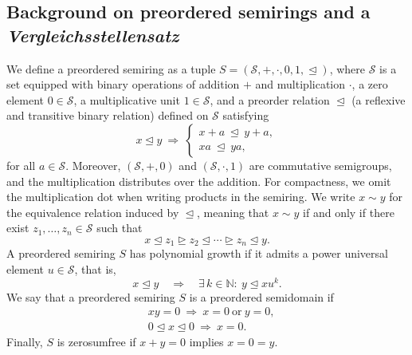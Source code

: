 \documentclass[aps,pra,11pt,onecolumn,nofootinbib,tightenlines]{revtex4-2}
\theoremstyle{definition}
\newcommand{\rleq}{\trianglelefteq}
\newcommand{\rgeq}{\trianglerighteq}
\begin{document}
\subsection{Background on preordered semirings and a \textit{Vergleichsstellensatz}}
\label{sec: background semiring}
We define a preordered semiring as a tuple $S = (\mathcal{S}, +, \cdot, 0, 1, \rleq)$, where $\mathcal{S}$ is a set equipped with binary operations of addition $+$ and multiplication $\cdot$, a zero element $0 \in \mathcal{S}$, a multiplicative unit $1 \in \mathcal{S}$, and a preorder relation $\rleq$  (a reflexive and transitive binary relation) defined on $\mathcal{S}$  satisfying
\begin{equation}
    x \rleq y \ \Rightarrow \
\begin{cases}
x + a \ \rleq\ y + a, \\[0.3em]
x a \ \rleq\ y a,
\end{cases}
\end{equation}
for all $a \in \mathcal{S}$.
Moreover,
$(\mathcal{S}, +, 0)$ and $(\mathcal{S}, \cdot, 1)$ are commutative semigroups, and the multiplication distributes over the addition.
For compactness, we omit the multiplication dot when writing products in the semiring.
We write $x \sim y$ for the equivalence relation induced by $\rleq$, meaning that $x \sim y$ if and only if there exist $z_1, \ldots, z_n \in \mathcal{S}$ such that
\begin{equation}
    x \rleq z_1 \rgeq z_2 \rleq \cdots \rgeq z_n \rleq y.
\end{equation}
A preordered semiring $S$ has polynomial growth if it admits a power universal element $u \in \mathcal{S}$, that is,
\begin{equation}
    x \rleq y \quad \Rightarrow \quad \exists\, k \in \mathbb{N}:\ y \rleq x u^k.
\end{equation}
We say that a preordered semiring $S$ is a preordered semidomain if
\begin{equation}
    \begin{aligned}
&xy = 0 \ \Rightarrow\ x = 0 \ \text{or} \ y = 0, \\
&0 \rleq x \rleq 0 \ \Rightarrow\ x = 0.
\end{aligned}
\end{equation}
Finally, $S$ is zerosumfree if $x + y = 0$ implies $x = 0 = y$.
\end{document}
